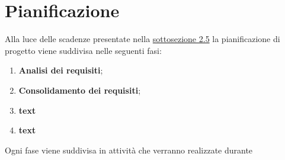 \section{Pianificazione}
Alla luce delle scadenze presentate nella \hyperlink{scadenze}{sottosezione 2.5} la pianificazione di progetto viene suddivisa nelle seguenti fasi:
\begin{enumerate}
	\item \textbf{Analisi dei requisiti};
	\item \textbf{Consolidamento dei requisiti};
	\item \textbf{text}
	\item \textbf{text}
\end{enumerate}
Ogni fase viene suddivisa in attività che verranno realizzate durante 